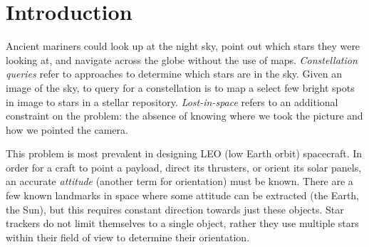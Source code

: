 \section{Introduction}\label{sec:introduction}
Ancient mariners could look up at the night sky, point out which stars they were looking at, and navigate across the
globe without the use of maps.
\textit{Constellation queries} refer to approaches to determine which stars are in the sky.
Given an image of the sky, to query for a constellation is to map a select few bright spots in image to stars in
a stellar repository.
\textit{Lost-in-space} refers to an additional constraint on the problem: the absence of knowing where we took
the picture and how we pointed the camera.


This problem is most prevalent in designing LEO (low Earth orbit) spacecraft.
In order for a craft to point a payload, direct its thrusters, or orient its solar panels, an accurate
\textit{attitude} (another term for orientation) must be known.
There are a few known landmarks in space where some attitude can be extracted (the Earth, the Sun), but this
requires constant direction towards just these objects.
Star trackers do not limit themselves to a single object, rather they use multiple stars within their field of view
to determine their orientation.


